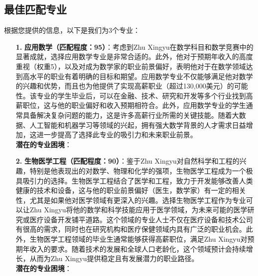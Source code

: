 \documentclass[12pt]{article}
\def\username{Xingyu Zhu\xspace}
\def\majorone{应用数学\xspace}
\def\majortwo{生物医学工程\xspace}
\begin{document}
\begin{CJK*}{UTF8}{gbsn}
\subsection*{最佳匹配专业}
根据您提供的信息，以下是我们为3个专业：
\begin{itemize}[leftmargin=1.5cm]
    \item[\textbf{1.}] \textbf{\majorone（匹配程度：95）}：考虑到Zhu Xingyu在数学科目和数学竞赛中的显著成就，选择应用数学专业是非常合适的。此外，他对于预期年收入的高度重视（权重5），以及对成为数学家的职业前景偏好，表明他对于在数学领域达到高水平的职业有着明确的目标和期望。应用数学专业不仅能够满足他对数学的兴趣和优势，而且也为他提供了实现高薪职业（超过130,000美元）的可能性。该专业的学生毕业后，可以在金融、技术、研究和开发等多个行业找到高薪职位，这与他的职业偏好和收入预期相符合。此外，应用数学专业的学生通常具备解决复杂问题的能力，这是许多高薪行业所需的关键技能。随着大数据、人工智能和机器学习等领域的兴起，拥有强大数学背景的人才需求日益增加，这进一步提高了选择此专业的吸引力和未来职业前景。
    \bigskip \\  \textbf{潜在的专业困境}：
        \begin{itemize}
        \end{itemize}

\vfill


\newpage
\vfill
    \item[\textbf{2.}] \textbf{\majortwo（匹配程度：90）}：鉴于Zhu Xingyu对自然科学和工程的兴趣，特别是他表现出的对数学、物理和化学的强项，生物医学工程成为一个极具吸引力的选择。生物医学工程结合了医学和工程，致力于开发能够改善人类健康的技术和设备，这与他的职业前景偏好（医生，数学家）有一定的相关性，尤其是如果他对医学领域有更深入的兴趣。选择生物医学工程作为专业可以让Zhu Xingyu将他的数学和科学技能应用于医学领域，为未来可能的医学研究或医疗设备开发铺平道路。这个领域的专业人士不仅在医疗设备和技术公司有很高的需求，同时也在研究机构和医疗保健领域内具有广泛的职业机会。此外，生物医学工程领域的毕业生通常能够获得高薪职位，满足Zhu Xingyu对预期年收入的要求。随着技术的发展和全球人口老龄化，这个领域预计会持续增长，从而为Zhu Xingyu提供稳定且有发展潜力的职业路径。
    \bigskip \\  \textbf{潜在的专业困境}：
    \begin{itemize}
    \end{itemize}
\vfill



\end{itemize}
\end{CJK*}
\end{document}
